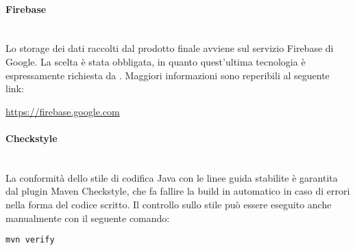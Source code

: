 \paragraph{Firebase}\mbox{}\\
Lo storage dei dati raccolti dal prodotto finale avviene sul servizio Firebase di Google. La scelta è stata obbligata, in quanto quest'ultima tecnologia è espressamente richiesta da \proponente .\newline
Maggiori informazioni sono reperibili al seguente link:\newline
\begin{center}
	\url{https://firebase.google.com}
\end{center}

\paragraph{Checkstyle}\mbox{}\\
La conformità dello stile di codifica Java con le linee guida stabilite è garantita dal plugin Maven Checkstyle, che fa fallire la build in automatico in caso di errori nella forma del codice scritto. Il controllo sullo stile può essere eseguito anche manualmente con il seguente comando:
\begin{center}
	\texttt{mvn verify}
\end{center}


